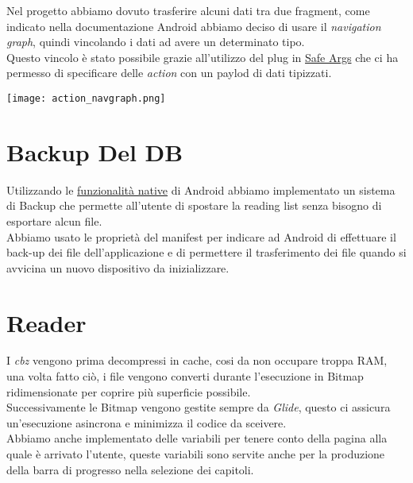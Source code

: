\documentclass[../Assignment-3-LPSMT.tex]{subfiles}
\begin{document}
Nel progetto abbiamo dovuto trasferire alcuni dati tra due fragment, come indicato nella documentazione Android abbiamo deciso di usare il \emph{navigation graph}, quindi vincolando i dati ad avere un determinato tipo.\\
Questo vincolo è stato possibile grazie all'utilizzo del plug in \href{https://developer.android.com/guide/navigation/use-graph/pass-data#Safe-args}{Safe Args} che ci ha permesso di specificare delle \emph{action} con un paylod di dati tipizzati.\\

\begin{center}
  \texttt{[image: action\_navgraph.png]}
\end{center}

\section{Backup Del DB}

Utilizzando le \href{https://developer.android.com/guide/topics/data/autobackup}{funzionalità native} di Android abbiamo implementato un sistema di Backup che permette all'utente di spostare la reading list senza bisogno di esportare alcun file.\\
Abbiamo usato le proprietà del manifest per indicare ad Android di effettuare il back-up dei file dell'applicazione e di permettere il trasferimento dei file quando si avvicina un nuovo dispositivo da inizializzare.

\section{Reader}

I \emph{cbz} vengono prima decompressi in cache, cosi da non occupare troppa RAM, una volta fatto ciò, i file vengono converti durante l'esecuzione in Bitmap ridimensionate per coprire più superficie possibile.\\
Successivamente le Bitmap vengono gestite sempre da \emph{Glide}, questo ci assicura un'esecuzione asincrona e minimizza il codice da sceivere.\\
Abbiamo anche implementato delle variabili per tenere conto della pagina alla quale è arrivato l'utente, queste variabili sono servite anche per la produzione della barra di progresso nella selezione dei capitoli.
\end{document}
